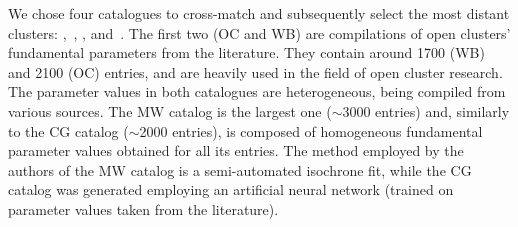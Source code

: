 \documentclass{aa}
\begin{document}
 We chose four catalogues to cross-match and subsequently select the most
 distant clusters: \citet[][New Catalog of Optically Visible Open Clusters and
 Candidates, hereinafter OC]{Dias_2002},~\citet[][WEBDA,\footnote{
 \url{https://webda.physics.muni.cz/}} hereinafter WB]{Netopil_2012},
 \citet[][Milky Way Star Clusters Catalog, hereinafter MW]{Kharchenko_2012},
 and~\citet[][hereinafter CG]{Cantat_2020}.
 The first two (OC and WB) are compilations of open clusters' fundamental
 parameters from the literature. They contain around 1700 (WB) and 2100 
 (OC) entries, and are heavily used in the field of open cluster research.
 The parameter values in both catalogues are heterogeneous, being compiled from
 various sources.
 The MW catalog is the largest one ($\sim$3000 entries) and, similarly to the CG
 catalog ($\sim$2000 entries), is composed of homogeneous fundamental parameter
 values obtained for all its entries. The method employed by the authors of the
 MW catalog is a semi-automated isochrone fit, while the CG catalog was
 generated employing an artificial neural network (trained on parameter values
 taken from the literature).
\end{document}
